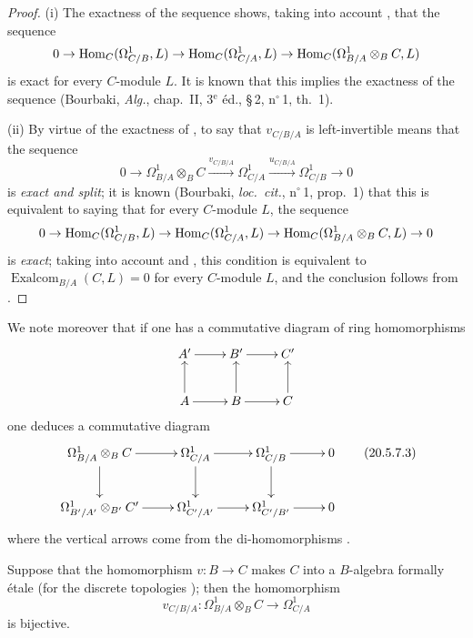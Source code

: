 \begin{proof}
(i) The exactness of the sequence  shows, taking into account , that the sequence
\[
  0\to\operatorname{Hom}_C(\Omega^1_{C/B},L)\to\operatorname{Hom}_C(\Omega^1_{C/A},L)\to\operatorname{Hom}_C(\Omega^1_{B/A}\otimes_B C,L)
\]
is exact for every $C$-module $L$.
It is known that this implies the exactness of the sequence  (Bourbaki, \emph{Alg.}, chap.~II, 3$^\text{e}$ \'{e}d., \S\,2, n$^\circ$\,1, th.~1).

\medskip
(ii) By virtue of the exactness of , to say that $v_{C/B/A}$ is left-invertible means that the sequence
\begin{equation}
\tag{20.5.7.2}
  \label{0.20.5.7.2}
  0\to\Omega^1_{B/A}\otimes_B C\xrightarrow{v_{C/B/A}}\Omega^1_{C/A}\xrightarrow{u_{C/B/A}}\Omega^1_{C/B}\to 0
\end{equation}
is \emph{exact and split}; it is known (Bourbaki, \emph{loc.\ cit.}, n$^\circ$\,1, prop.~1) that this is equivalent to saying that for every $C$-module $L$, the sequence
\[
  0\to\operatorname{Hom}_C(\Omega^1_{C/B},L)\to\operatorname{Hom}_C(\Omega^1_{C/A},L)\to\operatorname{Hom}_C(\Omega^1_{B/A}\otimes_B C,L)\to 0
\]
is \emph{exact}; taking into account  and , this condition is equivalent to $\operatorname{Exalcom}_{B/A}(C,L)=0$
for every $C$-module $L$, and the conclusion follows from .
\end{proof}

We note moreover that if one has a commutative diagram of ring homomorphisms
\[
\xymatrix{
  A' \ar[r] & B' \ar[r] & C' \\
  A \ar[u] \ar[r] & B \ar[u] \ar[r] & C \ar[u]
}
\]
one deduces a commutative diagram
\[
\xymatrix{
  \Omega^1_{B/A}\otimes_B C \ar[r] \ar[d] & \Omega^1_{C/A} \ar[r] \ar[d] & \Omega^1_{C/B} \ar[r] \ar[d] & 0 \\
  \Omega^1_{B'/A'}\otimes_{B'} C' \ar[r] & \Omega^1_{C'/A'} \ar[r] & \Omega^1_{C'/B'} \ar[r] & 0
}
\tag{20.5.7.3}
  \label{0.20.5.7.3}
\]
where the vertical arrows come from the di-homomorphisms .

\begin{corollary}[20.5.8]
\label{0.20.5.8}
Suppose that the homomorphism $v:B\to C$ makes $C$ into a $B$-algebra formally \'{e}tale \textup{(}for the discrete topologies \textup{)}; then the homomorphism 
\[
  v_{C/B/A}:\Omega^1_{B/A}\otimes_B C\to\Omega^1_{C/A}
\]
is bijective.
\end{corollary}

